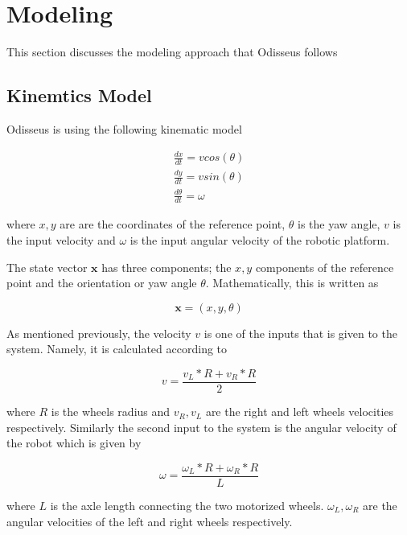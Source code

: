 \section{Modeling}
\label{modeling}

This section discusses the modeling approach that Odisseus follows

\subsection{Kinemtics Model}
\label{kinemtatics_model}

Odisseus is using the following kinematic model 

\begin{eqnarray}
\frac{dx}{dt} = v cos(\theta) \\
\frac{dy}{dt} = v sin(\theta) \\
\frac{d\theta}{dt} = \omega 
\end{eqnarray}

where $x,y$ are are the coordinates of the reference point, $\theta$ is the yaw angle, $v$ is the input velocity
and $\omega$ is the input angular velocity of the robotic platform.

The state vector $\mathbf{x}$ has three components; the $x, y$ components of the 
reference point and the orientation or yaw angle $\theta$. Mathematically, this is written as

\begin{equation}
\mathbf{x} = (x, y, \theta)
\label{state_vector}
\end{equation}

As mentioned previously, the velocity $v$ is one of the inputs that is given to the system. Namely, it is calculated according to

\begin{equation}
v = \frac{v_L*R + v_R *R}{2}
\label{odisseus_velocity}
\end{equation}

where $R$ is the wheels radius and $v_R,v_L$ are the right and left wheels velocities respectively. Similarly the second input to the system is the angular velocity of 
the robot which is given by

\begin{equation}
\omega = \frac{\omega_L*R + \omega_R *R}{L}
\label{odisseus_angular_velocity}
\end{equation}

where $L$ is the axle length connecting the two motorized wheels. $\omega_L, \omega_R$ are the angular velocities of the left and right wheels respectively.

